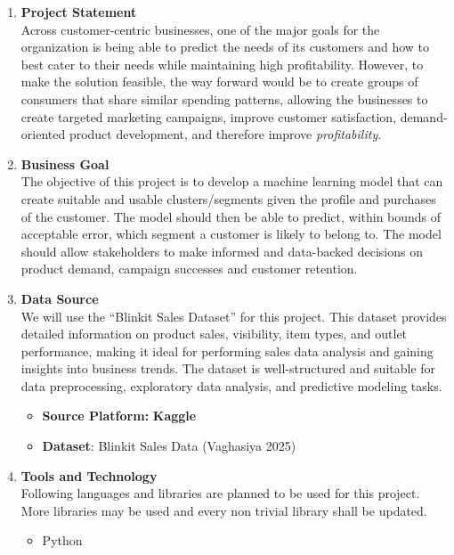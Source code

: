 \documentclass[
  letterpaper,
  DIV=11,
  numbers=noendperiod]{scrartcl}
\providecommand{\tightlist}{%
  \setlength{\itemsep}{0pt}\setlength{\parskip}{0pt}}
\begin{document}
\begin{enumerate}
\def\labelenumi{\arabic{enumi}.}
\item
  \textbf{Project Statement}\\
  Across customer-centric businesses, one of the major goals for the
  organization is being able to predict the needs of its customers and
  how to best cater to their needs while maintaining high profitability.
  However, to make the solution feasible, the way forward would be to
  create groups of consumers that share similar spending patterns,
  allowing the businesses to create targeted marketing campaigns,
  improve customer satisfaction, demand-oriented product development,
  and therefore improve \emph{profitability}.
\item
  \textbf{Business Goal}\\
  The objective of this project is to develop a machine learning model
  that can create suitable and usable clusters/segments given the
  profile and purchases of the customer. The model should then be able
  to predict, within bounds of acceptable error, which segment a
  customer is likely to belong to. The model should allow stakeholders
  to make informed and data-backed decisions on product demand, campaign
  successes and customer retention.
\item
  \textbf{Data Source}\\
  We will use the ``Blinkit Sales Dataset'' for this project. This
  dataset provides detailed information on product sales, visibility,
  item types, and outlet performance, making it ideal for performing
  sales data analysis and gaining insights into business trends. The
  dataset is well-structured and suitable for data preprocessing,
  exploratory data analysis, and predictive modeling tasks.

  \begin{itemize}
  \tightlist
  \item
    \textbf{Source Platform:} \textbf{Kaggle}
  \item
    \textbf{Dataset}: Blinkit Sales Data (Vaghasiya 2025)
  \end{itemize}
\item
  \textbf{Tools and Technology}\\
  Following languages and libraries are planned to be used for this
  project. More libraries may be used and every non trivial library
  shall be updated.

  \begin{itemize}
  \tightlist
  \item
    Python


\end{itemize}
\end{enumerate}
\end{document}
